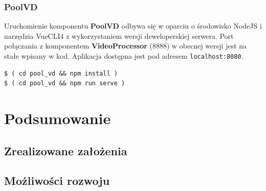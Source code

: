 \documentclass[12pt]{article}
\begin{document}
\subsubsection{PoolVD}
Uruchomienie komponentu \textbf{PoolVD} odbywa się w oparciu o środowisko NodeJS i narzędzia VueCLI4 \cite{vuecli} z wykorzystaniem wersji deweloperskiej serwera. Port połączania z komponentem \textbf{VideoProcessor} (8888) w obecnej wersji jest na stałe wpisany w kod. Aplikacja dostępna jest pod adresem \lstinline{localhost:8080}.
\begin{lstlisting}
$ ( cd pool_vd && npm install )
$ ( cd pool_vd && npm run serve )
\end{lstlisting}

\section{Podsumowanie}

\subsection{Zrealizowane założenia}

\subsection{Możliwości rozwoju}


\clearpage
\newpage

\printbibliography
\end{document}
